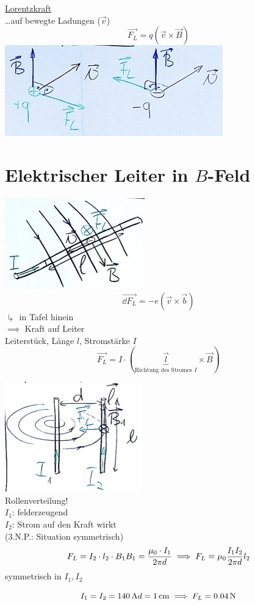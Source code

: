 \begin{rep*}[ note = Magnetfelder ]
	\uline{Lorentzkraft} \\
	\dots auf bewegte Ladungen ($\vec{v}$)
	\[ \boxed{ \vec{F_L} = q ( \vec{v} \times \vec{B} ) } \]
	\includegraphics{Bild204}
\end{rep*}

\section{Elektrischer Leiter in \texorpdfstring{$B$}{B}-Feld}
\includegraphics{Bild205} \\
\[ \vec{\dd F_L} = -e ( \vec{v} \times \vec{b} ) \]
$\drsh$ in Tafel hinein \\
$\implies$ Kraft auf Leiter \\
Leiterstück, Länge $l$, Stromstärke $I$
\[ \boxed{ \vec{F_L} = I \cdot ( \underbrace{\vec{l}}_{\text{Richtung des Stromes } I} \times \vec{B} ) } \]

\begin{bsp*}[ note = Kraft zwischen zwei Leitern ]
	\includegraphics{Bild206} \\
	Rollenverteilung! \\
	$I_1$: felderzeugend \\
	$I_2$: Strom auf den Kraft wirkt \\
	(3.N.P.: Situation symmetrisch)
	\[
		F_L = I_2 \cdot l_2 \cdot B_1 \\
		B_1 = \frac{\mu_0 \cdot I_1}{2 \pi d} \\
		\implies F_L = \mu_0 \frac{I_1 I_2}{2 \pi d} l_2
	\]
	symmetrisch in $I_1 , I_2$
	\begin{bsp*}[ note = im Experiment ]
		\[
			I_1 = I_2 = \SI{140}{\ampere} \\
			d = \SI{1}{\centi\metre}
			\implies F_L = \SI{0.04}{\newton}
		\]
	\end{bsp*}
\end{bsp*}

